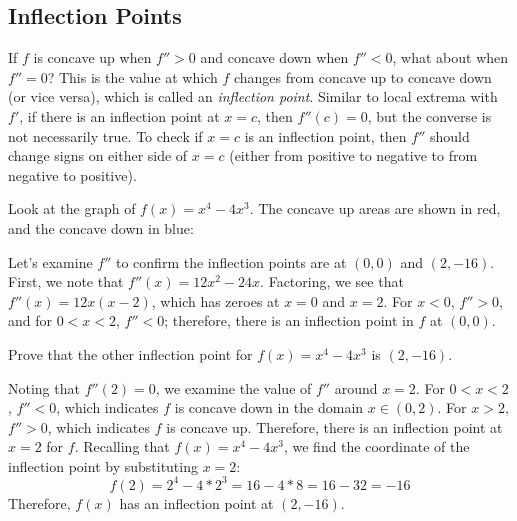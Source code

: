 \subsection{Inflection Points}
If $f$ is concave up when $f''>0$ and concave down when $f''<0$, what about when $f''=0$? This is the value at which $f$ changes from concave up to concave down (or vice versa), which is called an \textit{inflection point}. Similar to local extrema with $f'$, if there is an inflection point at $x=c$, then $f''(c)=0$, but the converse is not necessarily true. To check if $x=c$ is an inflection point, then $f''$ should change signs on either side of $x=c$ (either from positive to negative to from negative to positive). 

Look at the graph of $f(x) = x^4-4x^3$. The concave up areas are shown in red, and the concave down in blue:

\begin{figure}[htbp]
\centering
{}
\end{figure}
Let's examine $f''$ to confirm the inflection points are at $(0, 0)$ and $(2, -16)$. First, we note that $f''(x) = 12x^2-24x$. Factoring, we see that $f''(x) = 12x(x-2)$, which has zeroes at $x=0$ and $x=2$. For $x<0$, $f''>0$, and for $0<x<2$, $f''<0$; therefore, there is an inflection point in $f$ at $(0, 0)$. 

\begin{Exercise}[label=concavity1]
Prove that the other inflection point for $f(x) = x^4-4x^3$ is $(2, -16)$.
\end{Exercise}

\begin{Answer}[ref=concavity1]
Noting that $f''(2)=0$, we examine the value of $f''$ around $x=2$. For $0<x<2$, $f''<0$, which indicates $f$ is concave down in the domain $x \in (0,2)$. For $x>2$, $f''>0$, which indicates $f$ is concave up. Therefore, there is an inflection point at $x=2$ for $f$. Recalling that $f(x) = x^4-4x^3$, we find the coordinate of the inflection point by substituting $x=2$:
$$f(2) = 2^4-4*2^3=16-4*8=16-32=-16$$
Therefore, $f(x)$ has an inflection point at $(2, -16)$.
\end{Answer}
